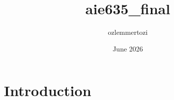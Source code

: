\documentclass{article}
\title{aie635_final}
\author{ozlemmertozi }
\date{June 2026}
\begin{document}
\maketitle

\section{Introduction}
\end{document}

